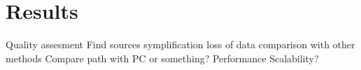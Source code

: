 \chapter{Results}
	Quality assesment
		Find sources
		symplification loss of data
		comparison with other methods
		Compare path with PC or something?
	Performance
	Scalability?